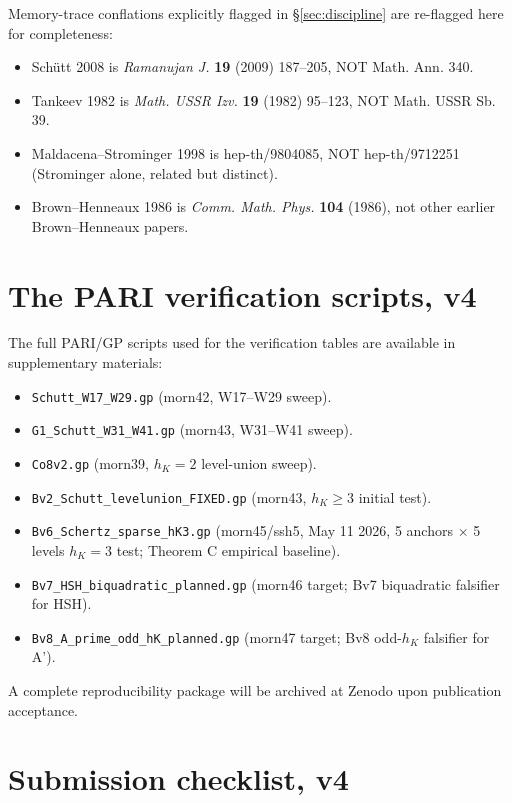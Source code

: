 \documentclass[11pt,a4paper]{amsart}
\theoremstyle{definition}
\newcommand{\hK}{h_{K}}
\begin{document}
Memory-trace conflations explicitly flagged in \S\ref{sec:discipline} are re-flagged here for completeness:
\begin{itemize}[leftmargin=2em]
  \item Sch\"utt 2008 is \emph{Ramanujan J.} \textbf{19} (2009) 187--205, NOT Math. Ann. 340.
  \item Tankeev 1982 is \emph{Math. USSR Izv.} \textbf{19} (1982) 95--123, NOT Math. USSR Sb. 39.
  \item Maldacena--Strominger 1998 is hep-th/9804085, NOT hep-th/9712251 (Strominger alone, related but distinct).
  \item Brown--Henneaux 1986 is \emph{Comm. Math. Phys.} \textbf{104} (1986), not other earlier Brown--Henneaux papers.
\end{itemize}


\section{The PARI verification scripts, v4}\label{app:pari-scripts-v4}

The full PARI/GP scripts used for the verification tables are available in supplementary materials:
\begin{itemize}[leftmargin=2em]
  \item \texttt{Schutt\_W17\_W29.gp} (morn42, W17--W29 sweep).
  \item \texttt{G1\_Schutt\_W31\_W41.gp} (morn43, W31--W41 sweep).
  \item \texttt{Co8v2.gp} (morn39, $\hK = 2$ level-union sweep).
  \item \texttt{Bv2\_Schutt\_levelunion\_FIXED.gp} (morn43, $\hK \ge 3$ initial test).
  \item \texttt{Bv6\_Schertz\_sparse\_hK3.gp} (morn45/ssh5, May 11 2026, 5 anchors $\times$ 5 levels $h_K = 3$ test; Theorem C empirical baseline).
  \item \texttt{Bv7\_HSH\_biquadratic\_planned.gp} (morn46 target; Bv7 biquadratic falsifier for HSH).
  \item \texttt{Bv8\_A\_prime\_odd\_hK\_planned.gp} (morn47 target; Bv8 odd-$\hK$ falsifier for A').
\end{itemize}

A complete reproducibility package will be archived at Zenodo upon publication acceptance.


\section{Submission checklist, v4}\label{app:checklist-v4}
\end{document}
